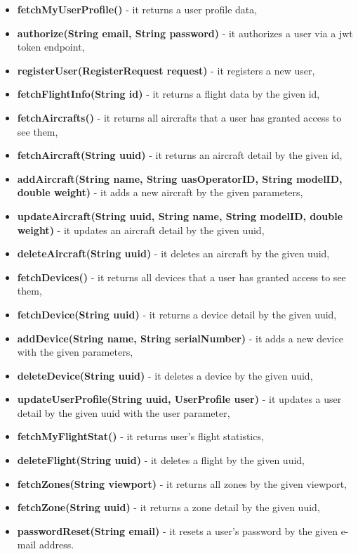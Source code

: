 \begin{itemize}
    \item \textbf{fetchMyUserProfile()} - it returns a user profile data,
    \item \textbf{authorize(String email, String password)} - it authorizes a user via a \acrshort{jwt} token endpoint,
    \item \textbf{registerUser(RegisterRequest request)} - it registers a new user,
    \item \textbf{fetchFlightInfo(String id)} - it returns a flight data by the given id,
    \item \textbf{fetchAircrafts()} - it returns all aircrafts that a user has granted access to see them,
    \item \textbf{fetchAircraft(String uuid)} - it returns an aircraft detail by the given id,
    \item \textbf{addAircraft(String name, String uasOperatorID, String modelID, double weight)} - it adds a new aircraft by the given parameters,
    \item \textbf{updateAircraft(String uuid, String name, String modelID, double weight)} - it updates an aircraft detail by the given uuid,
    \item \textbf{deleteAircraft(String uuid)} - it deletes an aircraft by the given uuid,
    \item \textbf{fetchDevices()} - it returns all devices that a user has granted access to see them,
    \item \textbf{fetchDevice(String uuid)} - it returns a device detail by the given uuid,
    \item \textbf{addDevice(String name, String serialNumber)} - it adds a new device with the given parameters,
    \item \textbf{deleteDevice(String uuid)} - it deletes a device by the given uuid,
    \item \textbf{updateUserProfile(String uuid, UserProfile user)} - it updates a user detail by the given uuid with the user parameter,
    \item \textbf{fetchMyFlightStat()} - it returns user's flight statistics,
    \item \textbf{deleteFlight(String uuid)} - it deletes a flight by the given uuid,
    \item \textbf{fetchZones(String viewport)} - it returns all zones by the given viewport,
    \item \textbf{fetchZone(String uuid)} - it returns a zone detail by the given uuid,
    \item \textbf{passwordReset(String email)} - it resets a user's password by the given e-mail address.
\end{itemize}

